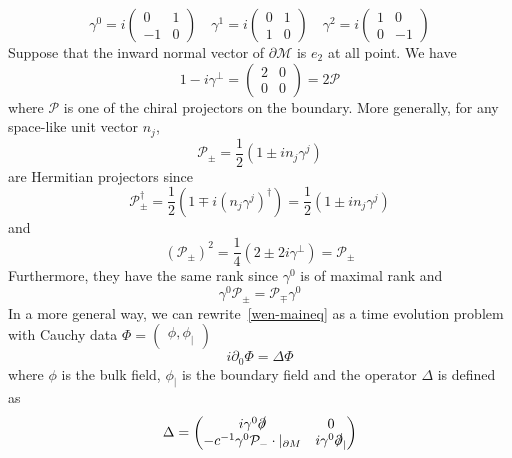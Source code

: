 \begin{equation*}
\gamma^0 = i\begin{pmatrix} 0 & 1 \\ -1 & 0 \end{pmatrix}  \quad
\gamma^1 = i\begin{pmatrix} 0 & 1 \\ 1 & 0 \end{pmatrix}  \quad
\gamma^2 = i\begin{pmatrix} 1 & 0 \\ 0 & -1 \end{pmatrix}  
\end{equation*}
Suppose that the inward normal vector of $\partial \mathcal{M}$ is $e_2$ at all point.
We have
\begin{equation*}
1 - i\gamma^\bot = 
\begin{pmatrix} 2 & 0 \\ 0 & 0\end{pmatrix} = 2 \mathcal{P}
\end{equation*}
where $\mathcal{P}$ is one of the chiral projectors on the boundary. 
More generally, for any space-like unit vector $n_j$,
\begin{equation*}
\mathcal{P}_\pm = \frac{1}{2}(1 \pm i n_j\gamma^j) 
\end{equation*}
are Hermitian projectors since 
\begin{equation*}
\mathcal{P}_\pm^\dagger = 
\frac{1}{2}(1 \mp i (n_j \gamma^j)^\dagger)=
\frac{1}{2}(1 \pm i n_j \gamma^j)
\end{equation*}
and
\begin{equation*}
(\mathcal{P}_\pm)^{2} = \frac{1}{4}(2\pm 2i \gamma^\bot) = \mathcal{P}_\pm
\end{equation*}
Furthermore, they have the same rank since $\gamma^0$ is of maximal rank and
\begin{equation*}
\gamma^0\mathcal{P}_\pm = \mathcal{P}_\mp\gamma^0
\end{equation*}
In a more general way, 
we can rewrite~\cref{wen-maineq} as a time evolution problem with Cauchy data
$\Phi = \begin{pmatrix}
\phi, \phi_|
\end{pmatrix}$
\begin{equation*}
i\partial_0 \Phi = \Delta \Phi
\end{equation*}
where $\phi$ is the bulk field, $\phi_|$ is the boundary field and the operator $\Delta$ is defined as
\begin{equation}\label{wen-hamiltonian}
\Delta = \begin{pmatrix}
i \gamma^0 \slashed{\partial}  & 0 \\
-c^{-1} \gamma^0 \mathcal{P}_- \cdot \vert_{\partial M}&  i\gamma^0 \slashed{\partial}_|
\end{pmatrix}
\end{equation}

